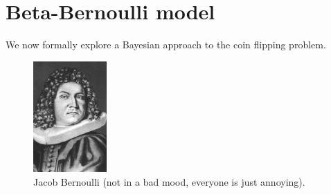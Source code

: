 \documentclass[12pt]{article}
\begin{document}

\section{Beta-Bernoulli model}
\label{section:Beta-Bernoulli}

We now formally explore a Bayesian approach to the coin flipping problem.

\begin{figure}
  \begin{center}
    \includegraphics[width=0.25\textwidth]{Bernoulli.jpg}
  \end{center}
  \caption{Jacob Bernoulli (not in a bad mood, everyone is just annoying).}
\end{figure}
\end{document}
